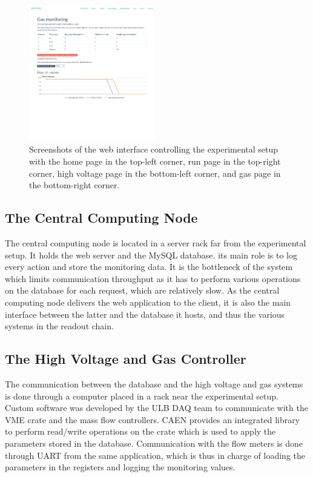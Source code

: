 \begin{figure}[h!]
        \includegraphics[width=0.49\textwidth]{img/III-1-arch/app-gas.png}
        \caption{Screenshots of the web interface controlling the experimental setup with the home page in the top-left corner, run page in the top-right corner, high voltage page in the bottom-left corner, and gas page in the bottom-right corner.}
        \label{fig:III-1-app}
      \end{figure}

    \subsection{The Central Computing Node}

      The central computing node is located in a server rack far from the experimental setup. It holds the web server and the MySQL database. its main role is to log every action and store the monitoring data. It is the bottleneck of the system which limits communication throughput as it has to perform various operations on the database for each request, which are relatively slow. As the central computing node delivers the web application to the client, it is also the main interface between the latter and the database it hosts, and thus the various systems in the readout chain.

    \subsection{The High Voltage and Gas Controller}

      The communication between the database and the high voltage and gas systems is done through a computer placed in a rack near the experimental setup. Custom software was developed by the ULB DAQ team to communicate with the VME crate and the mass flow controllers. CAEN provides an integrated library to perform read/write operations on the crate which is used to apply the parameters stored in the database. Communication with the flow meters is done through UART from the same application, which is thus in charge of loading the parameters in the registers and logging the monitoring values.

